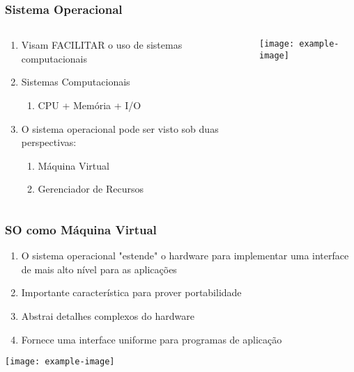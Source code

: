 \documentclass{beamer}
\begin{document}
\begin{frame}[fragile]
\frametitle{Sistema Operacional}

\begin{columns}
    \begin{column}{0.5\textwidth}
        \begin{enumerate}
            \item Visam FACILITAR o uso de sistemas computacionais
            \item Sistemas Computacionais
            \begin{enumerate}
                \item CPU + Memória + I/O
            \end{enumerate}
            \item O sistema operacional pode ser visto sob duas perspectivas:
            \begin{enumerate}
                \item Máquina Virtual
                \item Gerenciador de Recursos
            \end{enumerate}
        \end{enumerate}
    \end{column}
    
    \begin{column}{0.5\textwidth}
        \begin{center}
            \texttt{[image: example-image]}
        \end{center}
    \end{column}
\end{columns}
\end{frame}

\begin{frame}[fragile]
\frametitle{SO como Máquina Virtual}

\begin{enumerate}
    \vfill \item O sistema operacional "estende" o hardware para implementar uma interface de mais alto nível para as aplicações
    \vfill \item Importante característica para prover portabilidade
    \vfill \item Abstrai detalhes complexos do hardware
    \vfill \item Fornece uma interface uniforme para programas de aplicação
\end{enumerate}

\vfill \begin{center}
    \texttt{[image: example-image]}
\end{center}
\end{frame}
\end{document}
